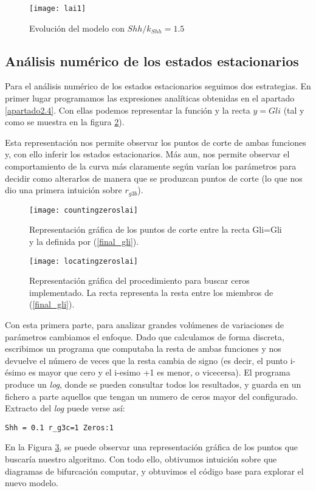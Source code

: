 \begin{figure}[h]
	\texttt{[image: lai1]}
	\centering
	\caption{Evolución del modelo \cite{schaffer} con $Shh/k_{Shh}=1.5$}
	\label{lai2}
\end{figure}

\subsection{Análisis numérico de los estados estacionarios}

Para el análisis numérico de los estados estacionarios seguimos dos estrategias. 
En primer lugar programamos las expresiones analíticas obtenidas en el apartado \ref{apartado2.4}. Con ellas podemos representar la función y la recta $y=Gli$ (tal y como se muestra en la figura \ref{lai_123}). 

Esta representación nos permite observar los puntos de corte de ambas funciones y, con ello inferir los estados estacionarios. Más aun, nos permite observar el comportamiento de la curva más claramente según varían los parámetros para decidir como alterarlos de manera que se produzcan puntos de corte (lo que nos dio una primera intuición sobre $r_{g3b}$).

\begin{figure}[h]
	\texttt{[image: countingzeroslai]}
	\centering
	\caption{Representación gráfica de los puntos de corte entre la recta Gli=Gli y la definida por (\ref{final_gli}).}
	\label{lai_123}
\end{figure}

\begin{figure}[h]
	\texttt{[image: locatingzeroslai]}
	\centering
	\caption{Representación gráfica del procedimiento para buscar ceros implementado. La recta representa la resta entre los miembros de (\ref{final_gli}).}
	\label{lai_124}
\end{figure}


Con esta primera parte, para analizar grandes volúmenes de variaciones de parámetros cambiamos el enfoque. Dado que calculamos de forma discreta, escribimos un programa que computaba la resta de ambas funciones y nos devuelve el número de veces que la resta cambia de signo (es decir, el punto i-ésimo es mayor que cero y el i-esimo +1 es menor, o vicecersa).
El programa produce un \textit{log}, donde se pueden consultar todos los resultados, y guarda en un fichero a parte aquellos que tengan un numero de ceros mayor del configurado.
Extracto del \textit{log} puede verse así:
\begin{verbatim}
Shh = 0.1 r_g3c=1 Zeros:1
\end{verbatim}
En la Figura \ref{lai_124}, se puede observar una representación gráfica de los puntos que buscaría nuestro algoritmo.
Con todo ello, obtivumos intuición sobre que diagramas de bifurcación computar, y obtuvimos el código base para explorar el nuevo modelo.




